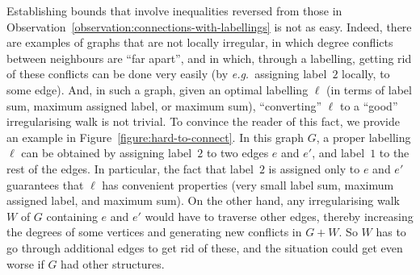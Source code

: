 \documentclass[a4paper,11pt,dvipsnames]{elsarticle}
\newcommand{\commenttext}[1]{ \begin{center} {\fbox{\begin{minipage}[h]{0.9 \linewidth}   {\textsf{ #1}} \end{minipage} }} \end{center}}
\newcommand{\Sam}[1]{{\color{red}\commenttext{Sam : #1}}}
\newcommand{\Paul}[1]{{\color{orange}\commenttext{Paul : #1}}}
\newcommand{\Sam}[1]{}
\begin{document}
Establishing bounds that involve inequalities reversed from those in Observation~\ref{observation:connections-with-labellings} is not as easy.
Indeed, there are examples of graphs that are not locally irregular, in which degree conflicts between neighbours are ``far apart'',
and in which, through a labelling, getting rid of these conflicts can be done very easily (by \textit{e.g.}~assigning label~$2$ locally, to some edge).
And, in such a graph, given an optimal labelling $\ell$ (in terms of label sum, maximum assigned label, or maximum sum),
``converting'' $\ell$ to a ``good'' irregularising walk is not trivial.
To convince the reader of this fact, we provide an example in Figure~\ref{figure:hard-to-connect}. In this graph $G$, a proper labelling $\ell$ can be obtained by assigning label~$2$ to two edges $e$ and $e'$, and label~$1$ to the rest of the edges. In particular, the fact that label~$2$ is assigned only to $e$ and $e'$ guarantees that $\ell$ has convenient properties (very small label sum, maximum assigned label, and maximum sum). On the other hand, any irregularising walk $W$ of $G$ containing $e$ and $e'$ would have to traverse other edges, thereby increasing the degrees of some vertices and generating new conflicts in $G+W$. So $W$ has to go through additional edges to get rid of these, and the situation could get even worse if $G$ had other structures.
\end{document}
